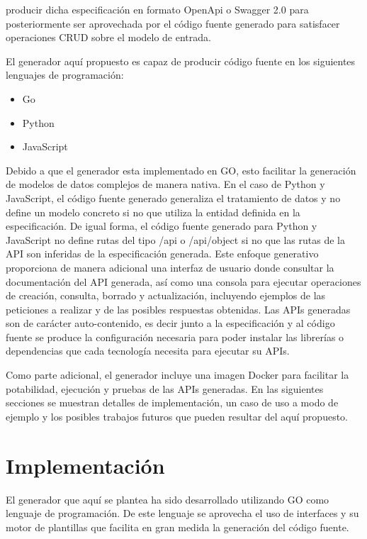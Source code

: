 \documentclass{svproc}
\begin{document}
producir dicha especificación en formato OpenApi o Swagger 2.0 para posteriormente ser aprovechada por el código fuente generado para satisfacer operaciones CRUD sobre el modelo de entrada.

El generador aquí propuesto es capaz de producir  código fuente en los siguientes lenguajes de programación:

\begin{itemize}
\item Go
\item Python
\item JavaScript
\end{itemize}

Debido  a que el generador esta implementado en GO, esto facilitar la generación de modelos de datos complejos de manera nativa. En el caso de Python y JavaScript, el código fuente generado generaliza el tratamiento de datos y no define un modelo concreto si no que utiliza la entidad definida en la especificación. De igual forma, el código fuente generado para Python y JavaScript no define rutas del tipo /api o /api/object si no que las rutas de la API son inferidas de la especificación generada. Este enfoque generativo proporciona de manera adicional una interfaz de usuario donde consultar la documentación del API generada, así como una consola para ejecutar operaciones de creación, consulta, borrado y actualización, incluyendo ejemplos de las peticiones a realizar y de las posibles respuestas obtenidas.  Las APIs generadas son de carácter auto-contenido,  es decir junto a la especificación y al código fuente se produce la configuración necesaria para poder instalar las librerías o dependencias que cada tecnología necesita para ejecutar su APIs. 

Como parte adicional, el generador incluye una imagen Docker para facilitar la potabilidad, ejecución y pruebas de las APIs generadas. En las siguientes secciones se muestran detalles de implementación, un caso de uso a modo de ejemplo y los posibles trabajos futuros que pueden resultar del aquí propuesto. 


\section{Implementación}

El generador que aquí se plantea ha sido desarrollado utilizando GO como lenguaje de programación. De este lenguaje se aprovecha el uso de interfaces y  su motor de plantillas que facilita en gran medida la generación del código fuente.  
\end{document}
